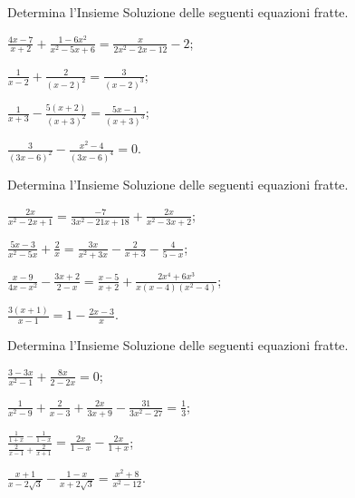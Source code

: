 \begin{esercizio}[\Ast]
 \label{ese:3.42}
Determina l'Insieme Soluzione delle seguenti equazioni fratte.
\begin{multicols}{2}
\begin{enumeratea}
\item $\frac{4 x-7}{x + 2} + \frac{1-6 x^{2}}{x^{2}-5 x + 6} =\frac{x}{2 x^{2}-2 x-12}-2$;
\item $\frac{1}{x-2} + \frac{2}{(x-2)^{2}} = \frac{3}{(x-2)^{3}}$;
\item $\frac{1}{x + 3}-\frac{5 (x + 2)}{(x + 3)^{2}} = \frac{5 x- 1}{(x + 3)^{3}}$;
\item $\frac{3}{(3 x-6)^{2}}-\frac{x^{2}-4}{(3 x-6)^{4}} = 0$.
\end{enumeratea}
\end{multicols}
\end{esercizio}

\begin{esercizio}[\Ast]
 \label{ese:3.43}
Determina l'Insieme Soluzione delle seguenti equazioni fratte.
\begin{multicols}{2}
\begin{enumeratea}
\item $\frac{2 x}{x^{2}-2 x + 1} = \frac{- 7}{3 x^{2}-21 x + 18}+ \frac{2 x}{x^{2}-3 x + 2}$;
\item $\frac{5 x-3}{x^{2}-5 x} + \frac{2}{x} = \frac{3 x}{x^{2}+ 3 x}-\frac{2}{x + 3}-\frac{4}{5-x}$;
\item $\frac{x-9}{4 x-x^{2}}-\frac{3 x + 2}{2-x} = \frac{x-5}{x + 2} + \frac{2 x^{4} + 6 x^{3}}{x (x-4) (x^{2}-4)}$;
\item $\frac{3 (x + 1)}{x-1}=1-\frac{2 x-3}{x}$.
\end{enumeratea}
\end{multicols}
\end{esercizio}

\begin{esercizio}[\Ast]
 \label{ese:3.44}
Determina l'Insieme Soluzione delle seguenti equazioni fratte.
\begin{multicols}{2}
\begin{enumeratea}
\item $\frac{3-3 x}{x^{2}-1} + \frac{8 x}{2-2 x} = 0$;
\item $\frac{1}{x^{2}-9} + \frac{2}{x-3} + \frac{2 x}{3 x + 9} -\frac{31}{3 x^{2}-27} = \frac{1}{3}$;
\item $\frac{\frac{1}{1 + x}-\frac{1}{1-x}}{\frac{2}{x-1} +\frac{2}{x + 1}} = \frac{2 x}{1-x}-\frac{2 x}{1 + x}$;
\item $\frac{x + 1}{x-2 \sqrt{3}}-\frac{1-x}{x + 2 \sqrt{3}} =\frac{x^{2} + 8}{x^{2}-12}$.
\end{enumeratea}
\end{multicols}
\end{esercizio}

